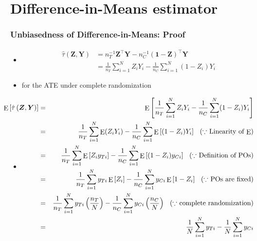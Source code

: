 \documentclass[table, xcolor = {dvipsnames}, 9pt]{beamer}
\theoremstyle{plain}
\newcommand{\mh}[1]{{\color{magenta}{#1}}}
\DeclareMathOperator{\E}{\rm{E}}
\begin{document}
\section{Difference-in-Means estimator}
\begin{frame}
  \frametitle{Unbiasedness of Difference-in-Means: Proof}
  \small
  \begin{itemize}
  \item \mh{Difference-in-Means estimator}
    \begin{align*}
      \hat{\tau}\left(\bm{Z}, \bm{Y}\right) & = n_T^{-1} \bm{Z}^{\top} \bm{Y} - n_C^{-1} \left(\bm{1} - \bm{Z}\right)^{\top}\bm{Y} \\ 
      & = \frac{1}{n_T} \sum_{i=1}^N Z_i Y_i - \frac{1}{n_C} \sum_{i = 1}^N (1 - Z_i) Y_i
    \end{align*} \pause
  \item \mh{Unbiased} for the ATE under complete randomization \pause
  \item[] 
    {\footnotesize
      \begin{eqnarray*}
        \hspace{-0.4in} \E\left[\hat{\tau}\left(\bm{Z}, \bm{Y}\right)\right] & = & \E\left[\frac{1}{n_T} \sum_{i=1}^N Z_i Y_i - \frac{1}{n_C} \sum_{i = 1}^N (1 - Z_i) Y_i\right]\\
        \hspace{-0.4in} & = &  \frac{1}{n_T} \sum_{i=1}^N \E(Z_i Y_i)
                              - \frac{1}{n_C} \sum_{i=1}^N \E\left[(1 - Z_i) Y_i\right] \hspace{0.1in}
                              \mbox{($\because$ Linearity of $\E$)}\\ 
        \hspace{-0.4in} & = &  \frac{1}{n_T} \sum_{i=1}^N \E\left[Z_i y_{Ti}\right]
                              - \frac{1}{n_C} \sum_{i=1}^N \E\left[(1 - Z_i) y_{Ci} \right] \hspace{0.1in}
                              \mbox{($\because$ Definition of POs)}\\ 
        \hspace{-0.4in} & = &  \frac{1}{n_T} \sum_{i=1}^N y_{Ti} \E\left[Z_i\right]
                              - \frac{1}{n_C} \sum_{i=1}^N y_{Ci} \E\left[1 - Z_i\right] \hspace{0.1in}
                              \mbox{($\because$ POs are fixed)}\\ 
         \hspace{-0.4in} & = &  \frac{1}{n_T} \sum_{i=1}^N y_{Ti} \left(\frac{n_T}{N}\right)
                              - \frac{1}{n_C} \sum_{i=1}^N y_{Ci} \left(\frac{n_C}{N}\right) \hspace{0.1in}
                              \mbox{($\because$ complete randomization)}\\ 
          \hspace{-0.4in} & = &  \frac{1}{N} \sum_{i=1}^N y_{Ti}
                              - \frac{1}{N} \sum_{i=1}^N y_{Ci}
      \end{eqnarray*}}
  \end{itemize}
\end{frame}
\end{document}

